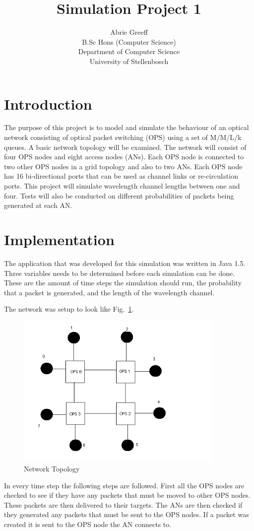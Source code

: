 \documentclass[a4paper,11pt,titlepage]{article}
\author{Abrie Greeff\\B.Sc Hons (Computer Science)\\Department of Computer Science\\University of Stellenbosch}
\title{Simulation Project 1}
\begin{document}
\maketitle
\section{Introduction}
The purpose of this project is to model and simulate the behaviour of an optical network consisting of optical packet switching (OPS) using a set of M/M/L/k queues. A basic network topology will be examined. The network will consist of four OPS nodes and eight access nodes (ANs). Each OPS node is connected to two other OPS nodes in a grid topology and also to two ANs. Each OPS node has 16 bi-directional ports that can be used as channel links or re-circulation ports. This project will simulate wavelength channel lengths between one and four. Tests will also be conducted on different probabilities of packets being generated at each AN.
\section{Implementation}
The application that was developed for this simulation was written in Java 1.5. Three variables needs to be determined before each simulation can be done. These are the amount of time steps the simulation should run, the probability that a packet is generated, and the length of the wavelength channel.

The network was setup to look like Fig.~\ref{fig:topo}.
\begin{figure}[htbp]
	\centering
	\includegraphics[width=10cm]{topo.png}
	\caption{Network Topology}
	\label{fig:topo}
\end{figure}
In every time step the following steps are followed. First all the OPS nodes are checked to see if they have any packets that must be moved to other OPS nodes. These packets are then delivered to their targets. The ANs are then checked if they generated any packets that must be sent to the OPS nodes. If a packet was created it is sent to the OPS node the AN connects to.
\end{document}
